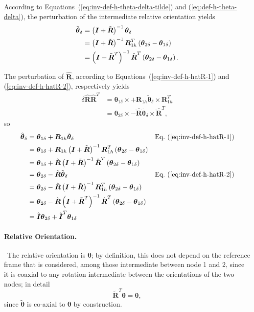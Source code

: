 \documentclass[10pt,dvips,fleqn,subeqn]{report}
\newcommand{\T}[1]{\boldsymbol{#1}}
\begin{document}
According to Equations~(\ref{eq:inv-def-h-theta-delta-tilde})
and (\ref{eq:def-h-theta-delta}),
the perturbation of the intermediate relative orientation yields
\begin{align}
	\tilde{\T{\theta}}_{\delta}
	&= \plbr{\T{I} + \tilde{\T{R}}}^{-1} \T{\theta}_{\delta} \\
	&= \plbr{\T{I} + \tilde{\T{R}}}^{-1}
		\T{R}_{1h}^T\plbr{\T{\theta}_{2\delta} - \T{\theta}_{1\delta}} \\
	&= \plbr{\T{I} + \tilde{\T{R}}^T}^{-1}
		\hat{\T{R}}^T\plbr{\T{\theta}_{2\delta} - \T{\theta}_{1\delta}} .
\end{align}

The perturbation of $\hat{\T{R}}$, according 
to Equations~(\ref{eq:inv-def-h-hatR-1}) and (\ref{eq:inv-def-h-hatR-2}),
respectively yields
\begin{align}
	\delta\hat{\T{R}} \hat{\T{R}}^T
	&= \T{\theta}_{1\delta} \times
		+ \T{R}_{1h} \tilde{\T{\theta}}_{\delta}\times \T{R}_{1h}^T \\
	&= \T{\theta}_{2\delta} \times
		- \hat{\T{R}} \tilde{\T{\theta}}_{\delta}\times \hat{\T{R}}^T ,
\end{align}
so
\begin{align}
	\hat{\T{\theta}}_{\delta}
	&= \T{\theta}_{1\delta}
		+ \T{R}_{1h} \tilde{\T{\theta}}_{\delta}
		&& \text{Eq.~(\ref{eq:inv-def-h-hatR-1})} \\
	&= \T{\theta}_{1\delta}
		+ \T{R}_{1h} \plbr{\T{I} + \tilde{\T{R}}}^{-1}
		\T{R}_{1h}^T \plbr{\T{\theta}_{2\delta} - \T{\theta}_{1\delta}} \\
	&= \T{\theta}_{1\delta}
		+ \hat{\T{R}} \plbr{\T{I} + \tilde{\T{R}}}^{-1}
		\hat{\T{R}}^T \plbr{\T{\theta}_{2\delta} - \T{\theta}_{1\delta}} \\
	&= \T{\theta}_{2\delta}
		- \hat{\T{R}} \tilde{\T{\theta}}_{\delta}
		&& \text{Eq.~(\ref{eq:inv-def-h-hatR-2})} \\
	&= \T{\theta}_{2\delta}
		- \hat{\T{R}} \plbr{\T{I} + \tilde{\T{R}}}^{-1}
		\T{R}_{1h}^T \plbr{\T{\theta}_{2\delta} - \T{\theta}_{1\delta}} \\
	&= \T{\theta}_{2\delta}
		- \hat{\T{R}} \plbr{\T{I} + \tilde{\T{R}}^T}^{-1}
		\hat{\T{R}}^T \plbr{\T{\theta}_{2\delta} - \T{\theta}_{1\delta}} \\
	&= \hat{\T{I}} \T{\theta}_{2\delta}
		+ \hat{\T{I}}^T \T{\theta}_{1\delta}
\end{align}

\paragraph{Relative Orientation.} \
The relative orientation is $\T{\theta}$; by definition, this does not depend
on the reference frame that is considered, among those intermediate 
between node 1 and 2, since it is coaxial to any rotation intermediate 
between the orientations of the two nodes; in detail
\begin{equation}
	\tilde{\T{R}}^T \T{\theta} = \T{\theta} ,
\end{equation}
since $\tilde{\T{\theta}}$ is co-axial to $\T{\theta}$
by construction.
\end{document}
